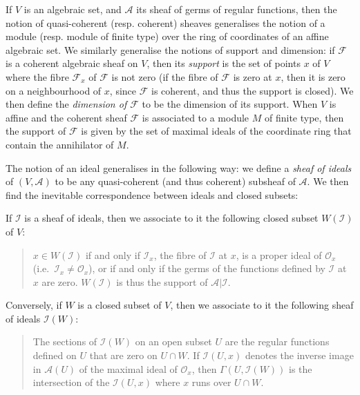 \documentclass[british]{article}
\newcommand{\oldpage}[1]{\marginpar{\footnotesize$\Big\vert$ \textit{p.~#1}}}
\begin{document}
If \(V\) is an algebraic set, and \({\mathscr{A}}\) its sheaf of germs
of regular functions, then the notion of quasi-coherent (resp. coherent)
sheaves generalises the notion of a module (resp. module of finite type)
over the ring of coordinates of an affine algebraic set. We similarly
generalise the notions of support and dimension: if \({\mathscr{F}}\) is
a coherent algebraic sheaf on \(V\), then its \emph{support} is the set
of points \(x\) of \(V\) where the fibre \({\mathscr{F}}_x\) of
\({\mathscr{F}}\) is not zero (if the fibre of \({\mathscr{F}}\) is zero
at \(x\), then it is zero on a neighbourhood of \(x\), since
\({\mathscr{F}}\) is coherent, and thus the support is closed). We then
define the \emph{dimension of \({\mathscr{F}}\)} to be the dimension of
its support. When \(V\) is affine and the coherent sheaf
\({\mathscr{F}}\) is associated to a module \(M\) of finite type, then
the support of \({\mathscr{F}}\) is given by the set of maximal ideals
of the coordinate ring that contain the annihilator of \(M\).

The notion of an ideal generalises in the following way: we define a
\emph{sheaf of ideals} of \((V,{\mathscr{A}})\) to be any quasi-coherent
(and thus coherent) subsheaf of \({\mathscr{A}}\). We then find the
inevitable correspondence between ideals and closed subsets:

If \({\mathscr{I}}\) is a sheaf of ideals, then we associate to it the
following closed subset \(W({\mathscr{I}})\) of \(V\):

\begin{quote}
\(x\in W({\mathscr{I}})\) if and only if \({\mathscr{I}}_x\), the fibre
of \({\mathscr{I}}\) at \(x\), is a proper ideal of \({\mathscr{O}}_x\)
(i.e.~\({\mathscr{I}}_x\neq{\mathscr{O}}_x\)), or if and only if the
germs of the functions defined by \({\mathscr{I}}\) at \(x\) are zero.
\(W({\mathscr{I}})\) is thus the support of
\({\mathscr{A}}|{\mathscr{I}}\).
\end{quote}

Conversely, if \(W\) is a closed subset of \(V\), then we associate to
it the following sheaf of ideals \({\mathscr{I}}(W)\): \oldpage{2-03}

\begin{quote}
The sections of \({\mathscr{I}}(W)\) on an open subset \(U\) are the
regular functions defined on \(U\) that are zero on \(U\cap W\). If
\({\mathscr{I}}(U,x)\) denotes the inverse image in \({\mathscr{A}}(U)\)
of the maximal ideal of \({\mathscr{O}}_x\), then
\(\Gamma(U,{\mathscr{I}}(W))\) is the intersection of the
\({\mathscr{I}}(U,x)\) where \(x\) runs over \(U\cap W\).
\end{quote}
\end{document}

